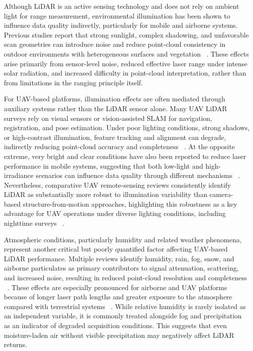 \documentclass{isprs} %
\begin{document}
Although LiDAR is an active sensing technology and does not rely on ambient light for range measurement, environmental illumination has been shown to influence data quality indirectly, particularly for mobile and airborne systems. Previous studies report that strong sunlight, complex shadowing, and unfavorable scan geometries can introduce noise and reduce point-cloud consistency in outdoor environments with heterogeneous surfaces and vegetation ~\cite{kaartinenLiDARBasedStructuralHealth2022}. These effects arise primarily from sensor-level noise, reduced effective laser range under intense solar radiation, and increased difficulty in point-cloud interpretation, rather than from limitations in the ranging principle itself.

For UAV-based platforms, illumination effects are often mediated through auxiliary systems rather than the LiDAR sensor alone. Many UAV LiDAR surveys rely on visual sensors or vision-assisted SLAM for navigation, registration, and pose estimation. Under poor lighting conditions, strong shadows, or high-contrast illumination, feature tracking and alignment can degrade, indirectly reducing point-cloud accuracy and completeness ~\cite{distefanoMobile3DScan2021}. At the opposite extreme, very bright and clear conditions have also been reported to reduce laser performance in mobile systems, suggesting that both low-light and high-irradiance scenarios can influence data quality through different mechanisms ~\cite{distefanoMobile3DScan2021}. Nevertheless, comparative UAV remote-sensing reviews consistently identify LiDAR as substantially more robust to illumination variability than camera-based structure-from-motion approaches, highlighting this robustness as a key advantage for UAV operations under diverse lighting conditions, including nighttime surveys ~\cite{guanReviewUAVBasedRemote2022}.

Atmospheric conditions, particularly humidity and related weather phenomena, represent another critical but poorly quantified factor affecting UAV-based LiDAR performance. Multiple reviews identify humidity, rain, fog, snow, and airborne particulates as primary contributors to signal attenuation, scattering, and increased noise, resulting in reduced point-cloud resolution and completeness ~\cite{kaartinenLiDARBasedStructuralHealth2022,distefanoMobile3DScan2021}. These effects are especially pronounced for airborne and UAV platforms because of longer laser path lengths and greater exposure to the atmosphere compared with terrestrial systems ~\cite{kaartinenLiDARBasedStructuralHealth2022}. While relative humidity is rarely isolated as an independent variable, it is commonly treated alongside fog and precipitation as an indicator of degraded acquisition conditions. This suggests that even moisture-laden air without visible precipitation may negatively affect LiDAR returns.
\end{document}
